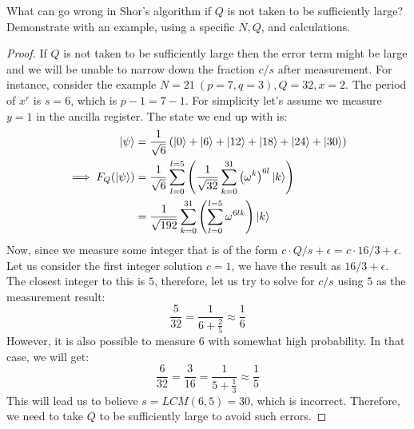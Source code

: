 \begin{solution}[label=ques:1a]
  \begin{question}
    What can go wrong in Shor's algorithm if $Q$ is not taken to be
sufficiently large?  Demonstrate with an example, using a specific $N, Q$, and calculations.
  \end{question}
  \tcblower{}
  \begin{proof}
    If $Q$ is not taken to be sufficiently large then the error term might be large and we will be unable to narrow down the fraction $c/s$ after measurement. For instance, consider the example $N = 21\ (p = 7, q = 3), Q = 32, x = 2$. The period of $x^r$ is $s = 6$, which is $p - 1 = 7 - 1$. For simplicity let's assume we measure $y = 1$ in the ancilla register. The state we end up with is:
    \begin{equation}
      \begin{split}
        \ket{\psi} &= \frac{1}{\sqrt{6}}\left(\ket{0} + \ket{6} + \ket{12} + \ket{18} + \ket{24} + \ket{30}\right)\\
        \implies F_Q(\ket{\psi}) &= \frac{1}{\sqrt{6}}\sum_{l=0}^{l=5}\left(\frac{1}{\sqrt{32}}\sum_{k=0}^{31}{\left(\omega^k\right)}^{6l}\ket{k}\right)\\
        &= \frac{1}{\sqrt{192}}\sum_{k=0}^{31}\left(\sum_{l=0}^{l=5}\omega^{6lk}\right)\ket{k}\\
      \end{split}
      \label{eq:smolQ}
    \end{equation}
    Now, since we measure some integer that is of the form $c\cdot Q / s + \epsilon = c\cdot 16 / 3 + \epsilon$. Let us consider the first integer solution $c = 1$, we have the result as $16 / 3 + \epsilon$. The closest integer to this is $5$, therefore, let us try to solve for $c/s$ using $5$ as the measurement result:
    \begin{equation}
      \frac{5}{32} = \frac{1}{6 + \frac{2}{5}} \approx \frac{1}{6}
      \label{eq:solvesmolQ}
    \end{equation}
    However, it is also possible to measure $6$ with somewhat high probability. In that case, we will get:
    \begin{equation}
      \frac{6}{32} = \frac{3}{16} = \frac{1}{5 + \frac{1}{3}} \approx \frac{1}{5}
      \label{eq:solvesmolQ2}
    \end{equation}
    This will lead us to believe $s = LCM(6, 5) = 30$, which is incorrect. Therefore, we need to take $Q$ to be sufficiently large to avoid such errors.
  \end{proof}
\end{solution}

